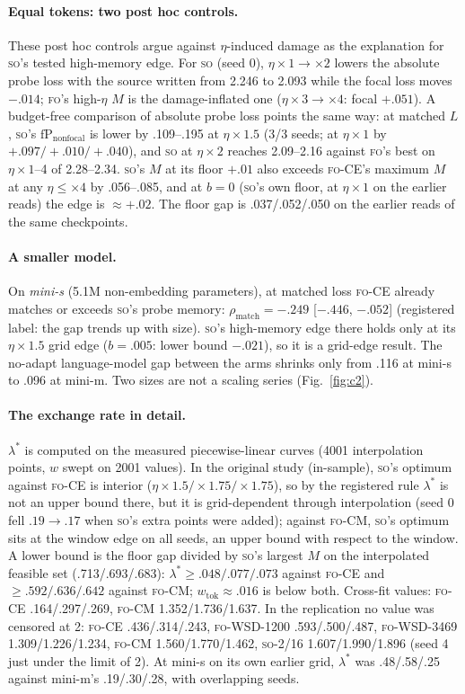 \documentclass[11pt]{article}
\newcommand{\FO}{\textsc{fo}}
\newcommand{\SO}{\textsc{so}}
\newcommand{\SOp}{\textsc{so}-2/16}
\newcommand{\lam}{\ensuremath{\lambda^{\ast}}}
\begin{document}
\paragraph{Equal tokens: two post hoc controls.} These post hoc controls argue against $\eta$-induced
damage as the explanation for \SO's tested high-memory edge. For \SO{} (seed 0), $\eta\times1\to\times2$ lowers the absolute probe loss with the source written
from 2.246 to 2.093 while the focal loss moves $-.014$; \FO's high-$\eta$ $M$ is the damage-inflated one
($\eta\times3\to\times4$: focal $+.051$). A budget-free comparison of absolute probe loss points the
same way: at matched $L$, \SO's $\mathrm{fP}_{\text{nonfocal}}$ is lower by .109--.195 at $\eta\times1.5$
(3/3 seeds; at $\eta\times1$ by $+.097/+.010/+.040$), and \SO{} at $\eta\times2$ reaches 2.09--2.16
against \FO's best on $\eta\times1$--4 of 2.28--2.34. \SO's $M$ at its floor $+.01$ also exceeds \FO-CE's maximum $M$ at any
$\eta\le\times4$ by .056--.085, and at $b=0$ (\SO's own floor, at $\eta\times1$ on the earlier reads) the
edge is $\approx+.02$. The floor gap is .037/.052/.050 on the earlier reads of the same checkpoints.

\paragraph{A smaller model.} On \emph{mini-s} (5.1M non-embedding parameters), at matched loss \FO-CE{}
already matches or exceeds \SO's probe memory: $\rho_{\text{match}}=-.249$ [$-.446$, $-.052$]
(registered label: the gap trends up with size). \SO's high-memory edge there holds only at its
$\eta\times1.5$ grid edge ($b=.005$: lower bound $-.021$), so it is a grid-edge result. The no-adapt
language-model gap between the arms shrinks only from .116 at mini-s to .096 at mini-m. Two sizes are
not a scaling series (Fig.~\ref{fig:c2}).

\paragraph{The exchange rate in detail.} $\lam$ is computed on the measured piecewise-linear curves
(4001 interpolation points, $w$ swept on 2001 values). In the original study (in-sample), \SO's optimum
against \FO-CE{} is interior ($\eta\times1.5/\times1.75/\times1.75$), so by the registered rule $\lam$ is
not an upper bound there, but it is grid-dependent through interpolation (seed 0 fell $.19\to.17$ when
\SO's extra points were added); against \FO-CM, \SO's optimum sits at the window edge on all seeds, an
upper bound with respect to the window. A lower bound is the floor gap divided by \SO's largest $M$ on
the interpolated feasible set (.713/.693/.683): $\lam\ge.048/.077/.073$ against \FO-CE{} and
$\ge.592/.636/.642$ against \FO-CM; $w_{\text{tok}}\approx.016$ is below both. Cross-fit values:
\FO-CE{} .164/.297/.269, \FO-CM{} 1.352/1.736/1.637. In the replication no value was censored at 2:
\FO-CE{} .436/.314/.243, \FO-WSD-1200 .593/.500/.487, \FO-WSD-3469 1.309/1.226/1.234, \FO-CM{}
1.560/1.770/1.462, \SOp{} 1.607/1.990/1.896 (seed 4 just under the limit of 2). At mini-s on its own
earlier grid, $\lam$ was .48/.58/.25 against mini-m's .19/.30/.28, with overlapping seeds.
\end{document}
